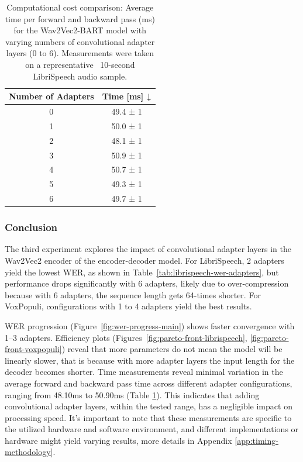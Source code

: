 \begin{table}[h]
    \centering
    \begin{tabular}{@{}cc@{}}
    \toprule
         Number of Adapters &  Time [ms] ↓   \\
         \midrule
         0 & 49.4 ± 1 \\
         1 & 50.0 ± 1 \\
         2 & 48.1 ± 1 \\
         3 & 50.9 ± 1 \\
         4 & 50.7 ± 1  \\
         5 & 49.3 ± 1  \\
         6 & 49.7 ± 1 \\
    \bottomrule
    \end{tabular}
    \caption{Computational cost comparison: Average time per forward and backward pass (ms) for the Wav2Vec2-BART model with varying numbers of convolutional adapter layers (0 to 6). Measurements were taken on a representative ~10-second LibriSpeech audio sample.}
    \label{tab:conv_time}
\end{table}

\subsubsection{Conclusion}

The third experiment explores the impact of convolutional adapter layers in the Wav2Vec2 encoder of the encoder-decoder model. For LibriSpeech, 2 adapters yield the lowest WER, as shown in Table~\ref{tab:librispeech-wer-adapters}, but performance drops significantly with 6 adapters, likely due to over-compression because with 6 adapters, the sequence length gets 64-times shorter. For VoxPopuli, configurations with 1 to 4 adapters yield the best results.

WER progression (Figure~\ref{fig:wer-progress-main}) shows faster convergence with 1–3 adapters. Efficiency plots (Figures~\ref{fig:pareto-front-librispeech}, \ref{fig:pareto-front-voxpopuli}) reveal that more parameters do not mean the model will be linearly slower, that is because with more adapter layers the input length for the decoder becomes shorter. Time measurements reveal minimal variation in the average forward and backward pass time across different adapter configurations, ranging from 48.10ms to 50.90ms (Table \ref{tab:conv_time}). This indicates that adding convolutional adapter layers, within the tested range, has a negligible impact on processing speed. It's important to note that these measurements are specific to the utilized hardware and software environment, and different implementations or hardware might yield varying results, more details in Appendix \ref{app:timing-methodology}.


